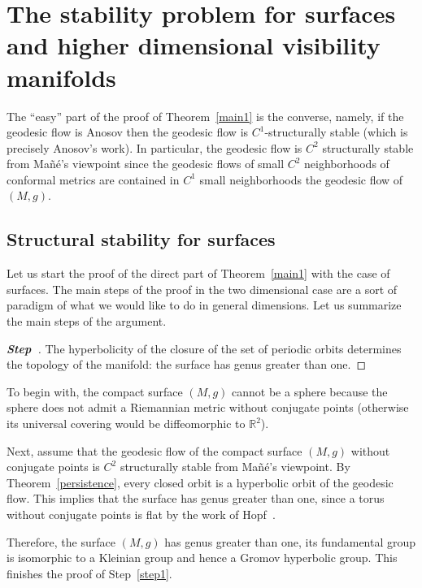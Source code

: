 \documentclass[10pt]{amsart}
\theoremstyle{definition}
\newcommand{\bbR}{\mathbb{R}}
\newcounter{steplcount}
\newenvironment{stepl}{\refstepcounter{steplcount}\begin{proof}[\textbf{Step~\thesteplcount}]}{\let\qed\relax\end{proof}}
\begin{document}
\section{The stability problem for surfaces and higher dimensional visibility manifolds}\label{sect.6}

The ``easy'' part of the proof of Theorem~\ref{main1} is the converse, namely, if the geodesic flow is Anosov then the geodesic flow is $C^{1}$-structurally stable (which is precisely Anosov's work). In particular, the geodesic flow is $C^{2}$ structurally stable from Mañé's viewpoint since the geodesic flows of small $C^{2}$ neighborhoods of conformal metrics are contained in $C^{1}$ small neighborhoods the geodesic flow of $(M,g)$.

\subsection{Structural stability for surfaces}
Let us start the proof of the direct part of Theorem~\ref{main1} with the case of surfaces. The main steps of the proof in the two dimensional case are a sort of paradigm of what we would like to do in general dimensions. Let us summarize the main steps of the argument.

\begin{stepl}\label{step1}
The hyperbolicity of the closure of the set of periodic orbits determines the topology of the manifold: the surface has genus greater than one.
\end{stepl}

To begin with, the compact surface $(M,g)$ cannot be a sphere because the sphere does not admit a Riemannian metric without conjugate points (otherwise its universal covering would be diffeomorphic to $\bbR^{2}$).

Next, assume that the geodesic flow of the compact surface $(M,g)$ without conjugate points is $C^{2}$ structurally stable from Mañé's viewpoint. By Theorem~\ref{persistence}, every closed orbit is a hyperbolic orbit of the geodesic flow. This implies that the surface has genus greater than one, since a torus without conjugate points is flat by the work of Hopf~\cite{kn:Hopf}.

Therefore, the surface $(M,g)$ has genus greater than one, its fundamental group is isomorphic to a Kleinian group and hence a Gromov hyperbolic group. This finishes the proof of Step~\ref{step1}.
\end{document}
